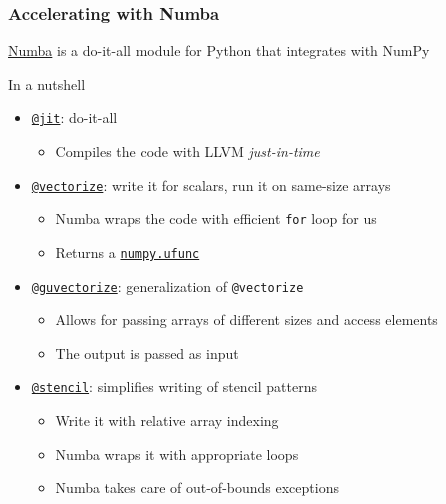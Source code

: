 \documentclass[10pt, aspectratio=1610]{beamer}
\begin{document}
\begin{frame}[fragile]
  \frametitle{Accelerating with Numba}

  \href{https://numba.pydata.org/numba-doc/latest/user/5minguide.html}{Numba} is a do-it-all module for Python that integrates with NumPy

  \vfill

  In a nutshell
  \begin{itemize}
    \item \href{https://numba.pydata.org/numba-doc/dev/reference/jit-compilation.html#numba.jit}{\texttt{@jit}}: do-it-all
      \begin{itemize}
        \item Compiles the code with LLVM \emph{just-in-time}
      \end{itemize}
    \item \href{https://numba.pydata.org/numba-doc/dev/reference/jit-compilation.html#numba.vectorize}{\texttt{@vectorize}}: write it for scalars, run it on same-size arrays
      \begin{itemize}
        \item Numba wraps the code with efficient \texttt{for} loop for us
        \item Returns a \href{https://docs.scipy.org/doc/numpy/reference/ufuncs.html}{\lstinline{numpy.ufunc}}
      \end{itemize}
    \item \href{https://numba.pydata.org/numba-doc/dev/reference/jit-compilation.html#numba.guvectorize}{\texttt{@guvectorize}}: generalization of \lstinline{@vectorize}
      \begin{itemize}
        \item Allows for passing arrays of different sizes and access elements
        \item The output is passed as input
      \end{itemize}
    \item \href{https://numba.pydata.org/numba-doc/dev/user/stencil.html#numba-stencil}{\texttt{@stencil}}: simplifies writing of stencil patterns
      \begin{itemize}
        \item Write it with relative array indexing
        \item Numba wraps it with appropriate loops
        \item Numba takes care of out-of-bounds exceptions
      \end{itemize}
  \end{itemize}

\end{frame}
\end{document}

